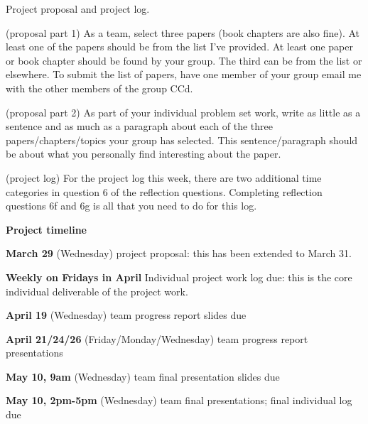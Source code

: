 \documentclass[12pt,letterpaper,answers]{exam}
\begin{document}
\begin{questions}
\question Project proposal and project log.
\begin{parts}
    \item (proposal part 1) As a team, select three papers (book chapters are also fine).  At least one of the papers should be from the list I've provided.  At least one paper or book chapter should be found by your group.  The third can be from the list or elsewhere.  To submit the list of papers, have one member of your group email me with the other members of the group CCd.
    \item (proposal part 2) As part of your individual problem set work, write as little as a sentence and as much as a paragraph about each of the three papers/chapters/topics your group has selected.  This sentence/paragraph should be about what you personally find interesting about the paper.
    \item (project log) For the project log this week, there are two additional time categories in question 6 of the reflection questions.  Completing reflection questions 6f and 6g is all that you need to do for this log.
\end{parts}

\end{questions}

\vfill

\noindent\textbf{Project timeline} 



\noindent\textbf{March 29} (Wednesday) project proposal: this has been extended to March 31. 

\noindent\textbf{Weekly on Fridays in April} Individual project work log due: this is the core individual deliverable of the project work.

\noindent\textbf{April 19} (Wednesday) team progress report slides due

\noindent\textbf{April 21/24/26} (Friday/Monday/Wednesday) team progress report presentations

\noindent\textbf{May 10, 9am} (Wednesday) team final presentation slides due

\noindent\textbf{May 10, 2pm-5pm} (Wednesday) team final presentations; final individual log due
\end{document}
